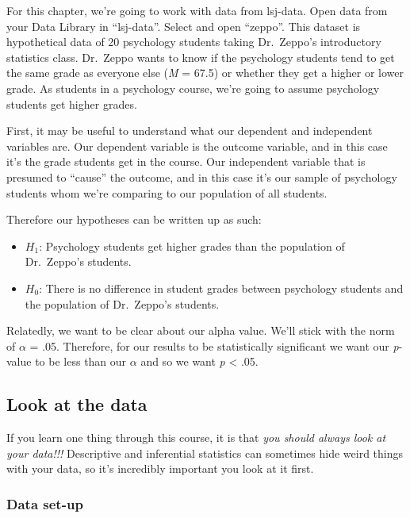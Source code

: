\documentclass[
]{book}
\providecommand{\tightlist}{%
  \setlength{\itemsep}{0pt}\setlength{\parskip}{0pt}}
\begin{document}
For this chapter, we're going to work with data from lsj-data. Open data from your Data Library in ``lsj-data''. Select and open ``zeppo''. This dataset is hypothetical data of 20 psychology students taking Dr.~Zeppo's introductory statistics class. Dr.~Zeppo wants to know if the psychology students tend to get the same grade as everyone else (\emph{M} = 67.5) or whether they get a higher or lower grade. As students in a psychology course, we're going to assume psychology students get higher grades.

First, it may be useful to understand what our dependent and independent variables are. Our dependent variable is the outcome variable, and in this case it's the grade students get in the course. Our independent variable that is presumed to ``cause'' the outcome, and in this case it's our sample of psychology students whom we're comparing to our population of all students.

Therefore our hypotheses can be written up as such:

\begin{itemize}
\tightlist
\item
  \(H_1\): Psychology students get higher grades than the population of Dr.~Zeppo's students.
\item
  \(H_0\): There is no difference in student grades between psychology students and the population of Dr.~Zeppo's students.
\end{itemize}

Relatedly, we want to be clear about our alpha value. We'll stick with the norm of \(\alpha\) = .05. Therefore, for our results to be statistically significant we want our \emph{p}-value to be less than our \(\alpha\) and so we want \emph{p} \textless{} .05.

\hypertarget{look-at-the-data}{%
\subsection{Look at the data}\label{look-at-the-data}}

If you learn one thing through this course, it is that \emph{you should always look at your data!!!} Descriptive and inferential statistics can sometimes hide weird things with your data, so it's incredibly important you look at it first.

\hypertarget{data-set-up}{%
\subsubsection{Data set-up}\label{data-set-up}}
\end{document}
